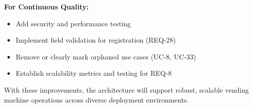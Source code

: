 \documentclass[11pt,a4paper]{article}
\begin{document}
\textbf{For Continuous Quality:}
\begin{itemize}
    \item Add security and performance testing
    \item Implement field validation for registration (REQ-28)
    \item Remove or clearly mark orphaned use cases (UC-8, UC-33)
    \item Establish scalability metrics and testing for REQ-8
\end{itemize}

With these improvements, the architecture will support robust, scalable vending machine operations across diverse deployment environments.
\end{document}
